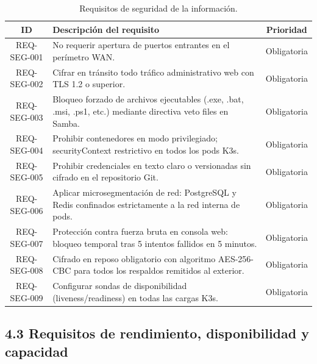 \documentclass[10pt,a4paper]{article}
\begin{document}
\begin{table}[htbp]
\centering
\small
\caption{Requisitos de seguridad de la información.}
\label{tab:req_seg}
\begin{tabular}{|c|p{11.5cm}|c|}
\hline
\textbf{\textsf{ID}} & \textbf{\textsf{Descripción del requisito}} & \textbf{\textsf{Prioridad}} \\
\hline
REQ-SEG-001 & No requerir apertura de puertos entrantes en el perímetro WAN. & Obligatoria \\
\hline
REQ-SEG-002 & Cifrar en tránsito todo tráfico administrativo web con TLS 1.2 o superior. & Obligatoria \\
\hline
REQ-SEG-003 & Bloqueo forzado de archivos ejecutables (.exe, .bat, .msi, .ps1, etc.) mediante directiva veto files en Samba. & Obligatoria \\
\hline
REQ-SEG-004 & Prohibir contenedores en modo privilegiado; securityContext restrictivo en todos los pods K3s. & Obligatoria \\
\hline
REQ-SEG-005 & Prohibir credenciales en texto claro o versionadas sin cifrado en el repositorio Git. & Obligatoria \\
\hline
REQ-SEG-006 & Aplicar microsegmentación de red: PostgreSQL y Redis confinados estrictamente a la red interna de pods. & Obligatoria \\
\hline
REQ-SEG-007 & Protección contra fuerza bruta en consola web: bloqueo temporal tras 5 intentos fallidos en 5 minutos. & Obligatoria \\
\hline
REQ-SEG-008 & Cifrado en reposo obligatorio con algoritmo AES-256-CBC para todos los respaldos remitidos al exterior. & Obligatoria \\
\hline
REQ-SEG-009 & Configurar sondas de disponibilidad (liveness/readiness) en todas las cargas K3s. & Obligatoria \\
\hline
\end{tabular}
\end{table}

\subsection{4.3 Requisitos de rendimiento, disponibilidad y capacidad}
\end{document}
